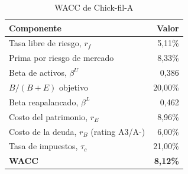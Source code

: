 \begin{table}[!htbp] \centering \scriptsize
\caption{WACC de Chick-fil-A}
\begin{tabular}{lr}
\toprule
Componente & Valor \\
\midrule
Tasa libre de riesgo, $r_f$ & 5{,}11\% \\
Prima por riesgo de mercado & 8{,}33\% \\
Beta de activos, $\beta^U$ & 0{,}386 \\
$B/(B+E)$ objetivo & 20{,}00\% \\
Beta reapalancado, $\beta^L$ & 0{,}462 \\
Costo del patrimonio, $r_E$ & 8{,}96\% \\
Costo de la deuda, $r_B$ (rating A3/A-) & 6{,}00\% \\
Tasa de impuestos, $\tau_c$ & 21{,}00\% \\
\textbf{WACC} & \textbf{8{,}12\%} \\
\bottomrule
\end{tabular}
\end{table}
